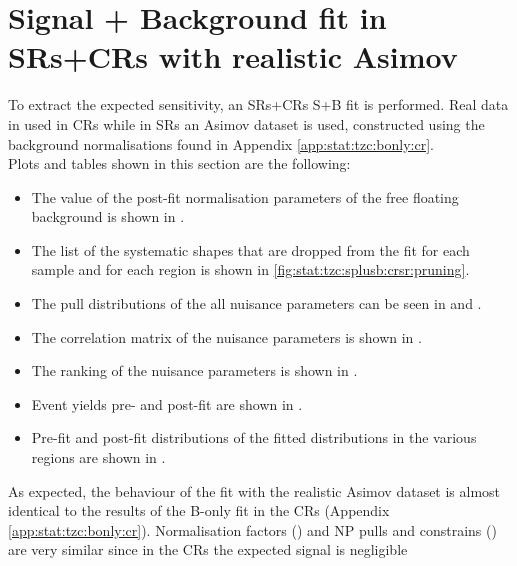 \section{Signal + Background fit in SRs+CRs with realistic Asimov}
\label{sec:stat:tzc:splusb:crsr}
To extract the expected sensitivity, an SRs+CRs S+B fit is performed. 
Real data in used in CRs while in SRs an Asimov dataset is used,
constructed using the background normalisations found in Appendix \ref{app:stat:tzc:bonly:cr}.\\
Plots and tables shown in this section are the following:
\begin{itemize}
\item The value of the post-fit normalisation parameters of the free floating background is shown in .
\item The list of the systematic shapes that are dropped from the fit for each sample and for each region is shown in \cref{fig:stat:tzc:splusb:crsr:pruning}.
\item The pull distributions of the all nuisance parameters can be seen in  and . 
\item The correlation matrix of the nuisance parameters is shown in . 
\item The ranking of the nuisance parameters is shown in . 
\item Event yields pre- and post-fit are shown in . 
\item Pre-fit and post-fit distributions of the fitted distributions in the various regions are shown in .
\end{itemize}
As expected, the behaviour of the fit with the realistic Asimov dataset
is almost identical to the results of the B-only fit in the CRs
(Appendix \ref{app:stat:tzc:bonly:cr}). 
Normalisation factors () and NP
pulls and constrains 
() 
are very similar since in the CRs the expected signal is negligible
